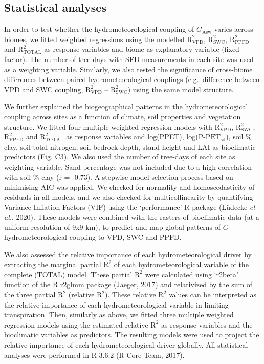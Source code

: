 \documentclass[11pt,twoside]{reedthesis}
\begin{document}
\subsection{Statistical analyses}\label{statistical-analyses}

In order to test whether the hydrometeorological coupling of
\(G_{\text{Asw}}\) varies across biomes, we fitted weighted regressions
using the modelled \(\text{R}^2_{\text{VPD}}\),
\(\text{R}^2_{\text{SWC}}\), \(\text{R}^2_{\text{PPFD}}\) and
\(\text{R}^2_{\text{TOTAL}}\) as response variables and biome as
explanatory variable (fixed factor). The number of tree-days with SFD
measurements in each site was used as a weighting variable. Similarly,
we also tested the significance of cross-biome differences between
paired hydrometeorological couplings (e.g.~difference between VPD and
SWC coupling, \(\text{R}^2_{\text{VPD}}\) --
\(\text{R}^2_{\text{SWC}}\)) using the same model structure.\par

We further explained the biogeographical patterns in the
hydrometeorological coupling across sites as a function of climate, soil
properties and vegetation structure. We fitted four multiple weighted
regression models with \(\text{R}^2_{\text{VPD}}\),
\(\text{R}^2_{\text{SWC}}\), \(\text{R}^2_{\text{PPFD}}\) and
\(\text{R}^2_{\text{TOTAL}}\) as response variables and log(PPET),
log(\(\text{P-PET}_{\text{sd}}\)), soil \% clay, soil total nitrogen,
soil bedrock depth, stand height and LAI as bioclimatic predictors (Fig.
C3). We also used the number of tree-days of each site as weighting
variable. Sand percentage was not included due to a high correlation
with soil \% clay (r = -0.73). A stepwise model selection process based
on minimising AIC was applied. We checked for normality and
homoscedasticity of residuals in all models, and we also checked for
multicollinearity by quantifying Variance Inflation Factors (VIF) using
the `performance' R package (Lüdecke \emph{et al.}, 2020). These models
were combined with the rasters of bioclimatic data (at a uniform
resolution of 9x9 km), to predict and map global patterns of \(G\)
hydrometeorological coupling to VPD, SWC and PPFD.\par

We also assessed the relative importance of each hydrometeorological
driver by extracting the marginal partial \(\text{R}^2\) of each
hydrometeorological variable of the complete (TOTAL) model. These
partial \(\text{R}^2\) were calculated using `r2beta' function of the R
r2glmm package (Jaeger, 2017) and relativized by the sum of the three
partial \(\text{R}^2\) (relative \(\text{R}^2\)). These relative
\(\text{R}^2\) values can be interpreted as the relative importance of
each hydrometeorological variable in limiting transpiration. Then,
similarly as above, we fitted three multiple weighted regression models
using the estimated relative \(\text{R}^2\) as response variables and
the bioclimatic variables as predictors. The resulting models were used
to project the relative importance of each hydrometeorological driver
globally. All statistical analyses were performed in R 3.6.2 (R Core
Team, 2017).\par
\end{document}
